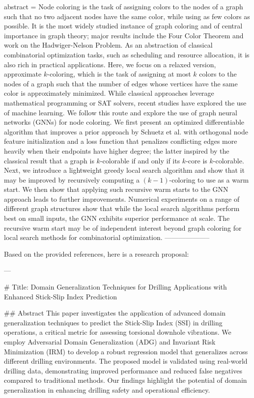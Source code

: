 {      abstract = {Node coloring is the task of assigning colors to the nodes of a graph such that no two adjacent nodes have the same color, while using as few colors as possible. It is the most widely studied instance of graph coloring and of central importance in graph theory; major results include the Four Color Theorem and work on the Hadwiger-Nelson Problem. As an abstraction of classical combinatorial optimization tasks, such as scheduling and resource allocation, it is also rich in practical applications. Here, we focus on a relaxed version, approximate $k$-coloring, which is the task of assigning at most $k$ colors to the nodes of a graph such that the number of edges whose vertices have the same color is approximately minimized. While classical approaches leverage mathematical programming or SAT solvers, recent studies have explored the use of machine learning. We follow this route and explore the use of graph neural networks (GNNs) for node coloring. We first present an optimized differentiable algorithm that improves a prior approach by Schuetz et al. with orthogonal node feature initialization and a loss function that penalizes conflicting edges more heavily when their endpoints have higher degree; the latter inspired by the classical result that a graph is $k$-colorable if and only if its $k$-core is $k$-colorable. Next, we introduce a lightweight greedy local search algorithm and show that it may be improved by recursively computing a $(k-1)$-coloring to use as a warm start. We then show that applying such recursive warm starts to the GNN approach leads to further improvements. Numerical experiments on a range of different graph structures show that while the local search algorithms perform best on small inputs, the GNN exhibits superior performance at scale. The recursive warm start may be of independent interest beyond graph coloring for local search methods for combinatorial optimization.}
}
        --------------------
        


Based on the provided references, here is a research proposal:

---

# Title: Domain Generalization Techniques for Drilling Applications with Enhanced Stick-Slip Index Prediction

## Abstract
This paper investigates the application of advanced domain generalization techniques to predict the Stick-Slip Index (SSI) in drilling operations, a critical metric for assessing torsional downhole vibrations. We employ Adversarial Domain Generalization (ADG) and Invariant Risk Minimization (IRM) to develop a robust regression model that generalizes across different drilling environments. The proposed model is validated using real-world drilling data, demonstrating improved performance and reduced false negatives compared to traditional methods. Our findings highlight the potential of domain generalization in enhancing drilling safety and operational efficiency.


